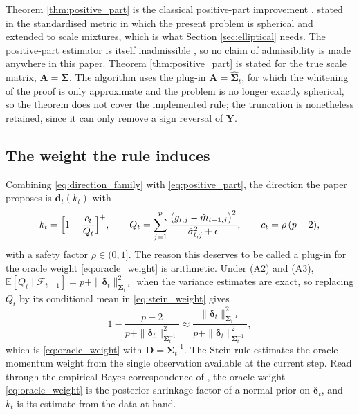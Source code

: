 \documentclass[a4paper,fleqn]{cas-sc}
\theoremstyle{plain}
\theoremstyle{definition}
\theoremstyle{remark}
\newcommand{\rev}[1]{#1}
\newcommand{\E}{\mathbb{E}}
\begin{document}
Theorem \ref{thm:positive_part} is the classical positive-part improvement \citep{baranchik1970, lehmann1998}, stated in the standardised metric in which the present problem is spherical and extended to scale mixtures, which is what Section \ref{sec:elliptical} needs. The positive-part estimator is itself inadmissible \citep{shao1994}, so no claim of admissibility is made anywhere in this paper. \rev{Theorem \ref{thm:positive_part} is stated for the true scale matrix, $\bm A=\bm\Sigma$. The algorithm uses the plug-in $\bm A=\widehat{\bm\Sigma}_t$, for which the whitening of the proof is only approximate and the problem is no longer exactly spherical, so the theorem does not cover the implemented rule; the truncation is nonetheless retained, since it can only remove a sign reversal of $\bm Y$.}

\subsection{The weight the rule induces}

Combining \eqref{eq:direction_family} with \eqref{eq:positive_part}, the direction the paper proposes is $\bm d_t(k_t)$ with
\begin{equation}
\label{eq:stein_weight}
k_t=\Bigl[1-\frac{c_t}{Q_t}\Bigr]^{+},
\qquad
Q_t=\sum_{j=1}^{p}\frac{\bigl(g_{t,j}-\hat m_{t-1,j}\bigr)^2}{\hat\sigma^2_{t,j}+\epsilon},
\qquad
c_t=\rho\,(p-2),
\end{equation}
with a safety factor $\rho\in(0,1]$. The reason this deserves to be called a plug-in for the oracle weight \eqref{eq:oracle_weight} is arithmetic. Under (A2) and (A3), $\E[Q_t\mid\mathcal F_{t-1}]=p+\|\bm\delta_t\|^2_{\bm\Sigma_t^{-1}}$ when the variance estimates are exact, so replacing $Q_t$ by its conditional mean in \eqref{eq:stein_weight} gives
\begin{equation}
1-\frac{p-2}{p+\|\bm\delta_t\|^2_{\bm\Sigma_t^{-1}}}
\approx
\frac{\|\bm\delta_t\|^2_{\bm\Sigma_t^{-1}}}{p+\|\bm\delta_t\|^2_{\bm\Sigma_t^{-1}}},
\end{equation}
which is \eqref{eq:oracle_weight} with $\bm D=\bm\Sigma_t^{-1}$. The Stein rule estimates the oracle momentum weight from the single observation available at the current step. Read through the empirical Bayes correspondence of \citet{efronmorris1973,efron2012}, the oracle weight \eqref{eq:oracle_weight} is the posterior shrinkage factor of a normal prior on $\bm\delta_t$, and $k_t$ is its estimate from the data at hand.
\end{document}

